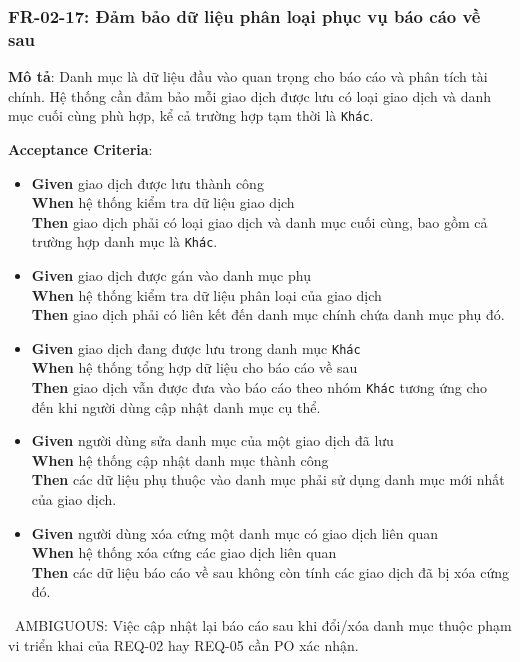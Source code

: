 \subsubsection{FR-02-17: Đảm bảo dữ liệu phân loại phục vụ báo cáo về sau}

\textbf{Mô tả}: Danh mục là dữ liệu đầu vào quan trọng cho báo cáo và phân tích tài chính. Hệ thống cần đảm bảo mỗi giao dịch được lưu có loại giao dịch và danh mục cuối cùng phù hợp, kể cả trường hợp tạm thời là \texttt{Khác}.



\textbf{Acceptance Criteria}:

\begin{itemize}
\item \textbf{Given} giao dịch được lưu thành công  \\ \hspace*{1.5em}  \textbf{When} hệ thống kiểm tra dữ liệu giao dịch  \\ \hspace*{1.5em}  \textbf{Then} giao dịch phải có loại giao dịch và danh mục cuối cùng, bao gồm cả trường hợp danh mục là \texttt{Khác}.
\item \textbf{Given} giao dịch được gán vào danh mục phụ  \\ \hspace*{1.5em}  \textbf{When} hệ thống kiểm tra dữ liệu phân loại của giao dịch  \\ \hspace*{1.5em}  \textbf{Then} giao dịch phải có liên kết đến danh mục chính chứa danh mục phụ đó.
\item \textbf{Given} giao dịch đang được lưu trong danh mục \texttt{Khác}  \\ \hspace*{1.5em}  \textbf{When} hệ thống tổng hợp dữ liệu cho báo cáo về sau  \\ \hspace*{1.5em}  \textbf{Then} giao dịch vẫn được đưa vào báo cáo theo nhóm \texttt{Khác} tương ứng cho đến khi người dùng cập nhật danh mục cụ thể.
\item \textbf{Given} người dùng sửa danh mục của một giao dịch đã lưu  \\ \hspace*{1.5em}  \textbf{When} hệ thống cập nhật danh mục thành công  \\ \hspace*{1.5em}  \textbf{Then} các dữ liệu phụ thuộc vào danh mục phải sử dụng danh mục mới nhất của giao dịch.
\item \textbf{Given} người dùng xóa cứng một danh mục có giao dịch liên quan  \\ \hspace*{1.5em}  \textbf{When} hệ thống xóa cứng các giao dịch liên quan  \\ \hspace*{1.5em}  \textbf{Then} các dữ liệu báo cáo về sau không còn tính các giao dịch đã bị xóa cứng đó.
\end{itemize}
\warningicon\  AMBIGUOUS: Việc cập nhật lại báo cáo sau khi đổi/xóa danh mục thuộc phạm vi triển khai của REQ-02 hay REQ-05 cần PO xác nhận.




